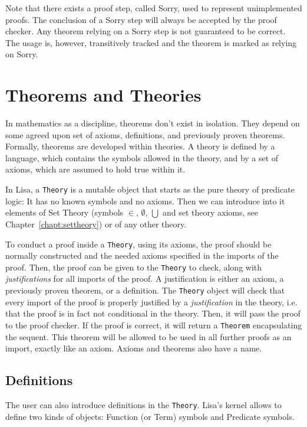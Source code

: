 Note that there exists a proof step, called Sorry, used to  represent unimplemented proofs. The conclusion of a Sorry step will always be accepted by the proof checker. Any theorem relying on a Sorry step is not guaranteed to be correct. The usage is, however, transitively tracked and the theorem is marked as relying on Sorry.


\section{Theorems and Theories}
\label{sec:TheoremsAndTheories}

In mathematics as a discipline, theorems don't exist in isolation. They depend on some agreed upon set of axioms, definitions, and previously proven theorems. Formally, theorems are developed within theories. A theory is defined by a language, which contains the symbols allowed in the theory, and by a set of axioms, which are assumed to hold true within it.

In Lisa, a \lstinline|Theory|{} is a mutable object that starts as the pure theory of predicate logic: It has no known symbols and no axioms. Then we can introduce into it elements of Set Theory (symbols $\in$, $\emptyset$, $\bigcup$ and set theory axioms, see Chapter~\ref{chapt:settheory}) or of any other theory.

To conduct a proof inside a \lstinline|Theory|{}, using its axioms, the proof should be normally constructed and the needed axioms specified in the imports of the proof. Then, the proof can be given to the \lstinline|Theory|{} to check, along with \textit{justifications} for all imports of the proof. A justification is either an axiom, a previously proven theorem, or a definition. The \lstinline|Theory|{} object will check that every import of the proof is properly justified by a \textit{justification} in the theory, i.e. that the proof is in fact not conditional in the theory. Then, it will pass the proof to the proof checker. If the proof is correct, it will return a \lstinline|Theorem|{} encapsulating the sequent. This theorem will be allowed to be used in all further proofs as an import, exactly like an axiom. Axioms and theorems also have a name.

\subsection{Definitions}
\label{subsec:definitions}
The user can also introduce definitions in the \lstinline|Theory|{}.
Lisa's kernel allows to define two kinds of objects: Function (or Term) symbols and Predicate symbols.


